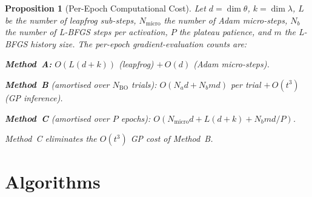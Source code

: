\documentclass[11pt]{article}
\newtheorem{proposition}[theorem]{Proposition}
\theoremstyle{definition}
\begin{document}
\begin{proposition}[Per-Epoch Computational Cost]
\label{prop:cost}
Let $d=\dim\theta$, $k=\dim\lambda$, $L$ be the number of leapfrog
sub-steps, $N_{\mathrm{micro}}$ the number of Adam micro-steps, $N_b$
the number of L-BFGS steps per activation, $P$ the plateau patience,
and $m$ the L-BFGS history size. The per-epoch gradient-evaluation
counts are:

\noindent\textbf{Method~A:} $O(L(d+k))$ (leapfrog)
$+\,O(d)$ (Adam micro-steps).

\noindent\textbf{Method~B} (amortised over $N_{\mathrm{BO}}$ trials):
$O(N_a d + N_b m d)$ per trial $+\,O(t^3)$ (GP inference).

\noindent\textbf{Method~C} (amortised over $P$ epochs):
$O(N_{\mathrm{micro}} d + L(d+k) + N_b m d/P)$.

Method~C eliminates the $O(t^3)$ GP cost of Method~B.
\end{proposition}


\section{Algorithms}
\end{document}
